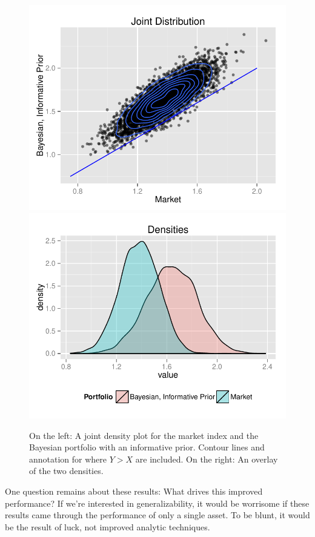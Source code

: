 \documentclass[a4paper]{article}\usepackage[]{graphicx}\usepackage[]{color}
\newenvironment{knitrout}{}{} %
\begin{document}
\begin{figure}[H]
\begin{knitrout}
\color{fgcolor}
\includegraphics[width=.49\linewidth]{figure/dist-pair-inform-1} 
\includegraphics[width=.49\linewidth]{figure/dist-pair-inform-2} 

\end{knitrout}
\caption{On the left: A joint density plot for the market index and the Bayesian portfolio with an informative prior. Contour lines and annotation for where $Y > X$ are included. On the right: An overlay of the two densities.}
\label{fig:probsinform}
\end{figure}

One question remains about these results: What drives this improved performance? If we're interested in generalizability, it would be worrisome if these results came through the performance of only a single asset. To be blunt, it would be the result of luck, not improved analytic techniques.
\end{document}
